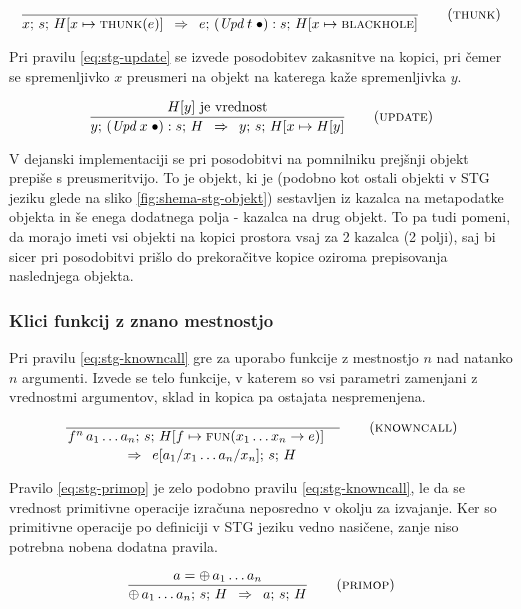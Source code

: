 \begin{equation}	
\infer[thunk]{}{
	x; \, s; \, H[x \mapsto \textsc{thunk}(e)]
}{
	e; \, (\textit{Upd} \; t \; \bullet) : s; \, H[x \mapsto \textsc{blackhole}]
}
\label{eq:stg-thunk}
\end{equation}

Pri pravilu \ref{eq:stg-update} se izvede posodobitev zakasnitve na kopici, pri čemer se spremenljivko $x$ preusmeri na objekt na katerega kaže spremenljivka $y$.

\begin{equation}
\infer[update]{
	\text{$H[y]$ je vrednost}
}{
	y; \, (\textit{Upd} \; x \; \bullet) : s; \, H
}{
	y; \, s; \, H[x \mapsto H[y]
}
\label{eq:stg-update}
\end{equation}

V dejanski implementaciji se pri posodobitvi na pomnilniku prejšnji ob\-je\-kt prepiše s preusmeritvijo. To je objekt, ki je (podobno kot ostali objekti v STG jeziku glede na sliko \ref{fig:shema-stg-objekt}) sestavljen iz kazalca na metapodatke objekta in še enega dodatnega polja - kazalca na drug objekt. To pa tudi pomeni, da morajo imeti vsi objekti na kopici prostora vsaj za 2 kazalca (2 polji), saj bi sicer pri posodobitvi prišlo do prekoračitve kopice oziroma prepisovanja naslednjega objekta.

\subsubsection{Klici funkcij z znano mestnostjo}

Pri pravilu \ref{eq:stg-knowncall} gre za uporabo funkcije z mestnostjo $n$ nad natanko $n$ argumenti. Izvede se telo funkcije, v katerem so vsi parametri zamenjani z vrednostmi argumentov, sklad in kopica pa ostajata nespremenjena.

\begin{equation}
	\linfer[knowncall]{}{
		f^n \, a_1 \dots a_n; \, s; \, H[f \mapsto \textsc{fun}(x_1 \dots x_n \to e)]
	}{
		e[a_1 / x_1 \dots a_n / x_n]; \, s; \, H
	}
\label{eq:stg-knowncall}
\end{equation}

Pravilo \ref{eq:stg-primop} je zelo podobno pravilu \ref{eq:stg-knowncall}, le da se vrednost primitivne operacije izračuna neposredno v okolju za izvajanje. Ker so primitivne operacije po definiciji v STG jeziku vedno nasičene, zanje niso potrebna nobena dodatna pravila.

\begin{equation}
	\infer[primop]{
		a = \oplus \, a_1 \dots a_n
	}{
		\oplus \, a_1 \dots a_n; \, s; \, H
	}{
		a; \, s; \, H
	}
\label{eq:stg-primop}
\end{equation}

